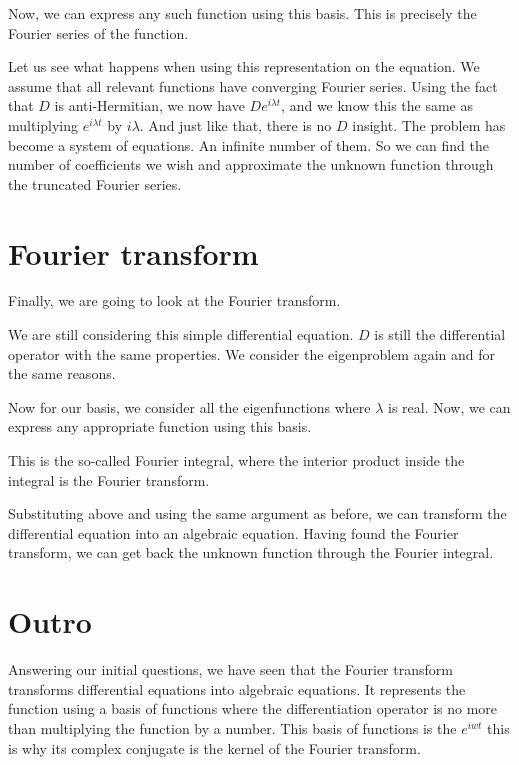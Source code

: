\documentclass{article}
\newcounter{problem}[section]\setcounter{problem}{1}
\begin{document}
Now, we can express any such function using this basis.
This is precisely the Fourier series of the function.

Let us see what happens when using this representation on the equation.
We assume that all relevant functions have converging Fourier series.
Using the fact that $D$ is anti-Hermitian, we now have $D e^{i\lambda t}$, and we know this the same as multiplying $e^{i\lambda t}$ by $i\lambda$.
And just like that, there is no $D$ insight. The problem has become a system of equations.
An infinite number of them.
So we can find the number of coefficients we wish and approximate the unknown function through the truncated Fourier series.

\section{Fourier transform}

Finally, we are going to look at the Fourier transform.

We are still considering this simple differential equation.
$D$ is still the differential operator with the same properties.
We consider the eigenproblem again and for the same reasons.

Now for our basis, we consider all the eigenfunctions where $\lambda$ is real.
Now, we can express any appropriate function using this basis.

This is the so-called Fourier integral, where the interior product inside the integral is the Fourier transform.

Substituting above and using the same argument as before, we can transform the differential equation into an algebraic equation.
Having found the Fourier transform, we can get back the unknown function through the Fourier integral.

\section{Outro}

Answering our initial questions, we have seen that the Fourier transform transforms differential equations into algebraic equations. It represents the function using a basis of functions where the differentiation operator is no more than multiplying the function by a number.
This basis of functions is the $e^{iwt}$ this is why its complex conjugate is the kernel of the Fourier transform.
\end{document}
